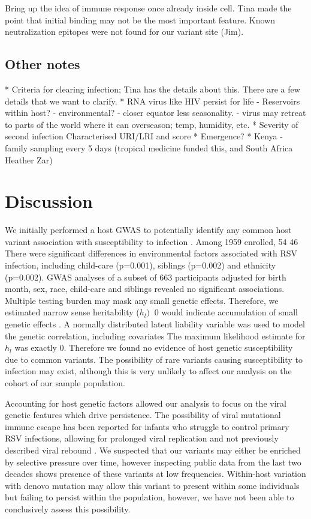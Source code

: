 \documentclass{article}
\begin{document}
Bring up the idea of immune response once already inside cell. 
Tina made the point that initial binding may not be the most important feature.
Known neutralization epitopes were not found for our variant site (Jim).

\subsection{Other notes}
* Criteria for clearing infection; Tina has the details about this. 
There are a few details that we want to clarify. 
* RNA virus like HIV persist for life
	- Reservoirs within host?
	- environmental?
	- closer equator less seasonality.
	- virus may retreat to parts of the world where it can overseason; temp, humidity, etc.
* Severity of second infection
	Characterised URI/LRI and score
* Emergence?
* Kenya - family sampling every 5 days (tropical medicine funded this, and South Africa Heather Zar)

\section{Discussion}
We initially performed a host GWAS to potentially identify any common host variant association with susceptibility to infection
\cite{lawless2020genome}.
Among 1959 enrolled,
 54%
 46%
There were significant differences in environmental factors associated with RSV infection, 
including child-care (p=0.001), 
siblings (p=0.002) and 
ethnicity (p=0.002). 
GWAS analyses of a subset of 663 participants 
adjusted for birth month, sex,  race, 
child-care and  siblings
revealed no significant associations. 
Multiple testing burden may mask any small genetic effects.
Therefore, we estimated narrow sense heritability ($h_l)$
$\>0$ would indicate accumulation of small genetic effects
\cite{golan2011accurate}.
A normally distributed latent liability variable 
was used to model the genetic correlation, 
including covariates
The maximum likelihood estimate 
for $h_l$ was exactly 0.
Therefore we found no evidence of host genetic susceptibility due to common variants. 
The possibility of rare variants causing susceptibility to infection may exist, 
although this is very unlikely to affect our analysis on the cohort of our sample population.

Accounting for host genetic factors allowed our analysis to focus on the viral genetic features which drive 
persistence.
The possibility of viral mutational immune escape has been reported for 
infants who struggle to control primary RSV infections, allowing for prolonged viral replication and not previously described viral rebound
\cite{brint2017prolonged}.
We suspected that our variants may either be enriched by selective pressure over time, 
however inspecting public data from the last two decades shows presence of these variants at low frequencies.
Within-host variation with denovo mutation may allow this variant to present within some individuals but failing to persist within the population, however, we have not been able to conclusively assess this possibility.
\end{document}
